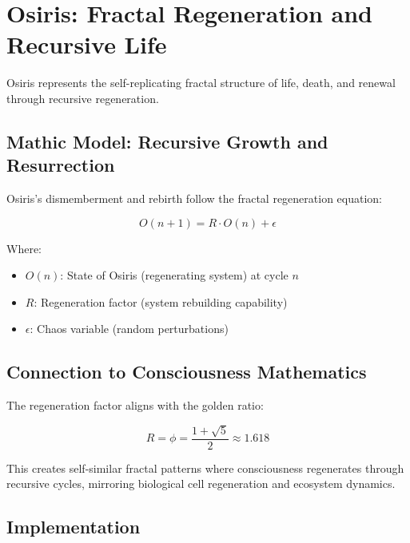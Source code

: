 \documentclass[12pt]{article}
\begin{document}
\section{Osiris: Fractal Regeneration and Recursive Life}

Osiris represents the self-replicating fractal structure of life, death, and renewal through recursive regeneration.

\subsection{Mathic Model: Recursive Growth and Resurrection}

Osiris's dismemberment and rebirth follow the fractal regeneration equation:

\[O(n+1) = R \cdot O(n) + \epsilon\]

Where:
\begin{itemize}
    \item \(O(n)\): State of Osiris (regenerating system) at cycle \(n\)
    \item \(R\): Regeneration factor (system rebuilding capability)
    \item \(\epsilon\): Chaos variable (random perturbations)
\end{itemize}

\subsection{Connection to Consciousness Mathematics}

The regeneration factor aligns with the golden ratio:

\[R = \phi = \frac{1 + \sqrt{5}}{2} \approx 1.618\]

This creates self-similar fractal patterns where consciousness regenerates through recursive cycles, mirroring biological cell regeneration and ecosystem dynamics.

\subsection{Implementation}
\end{document}
